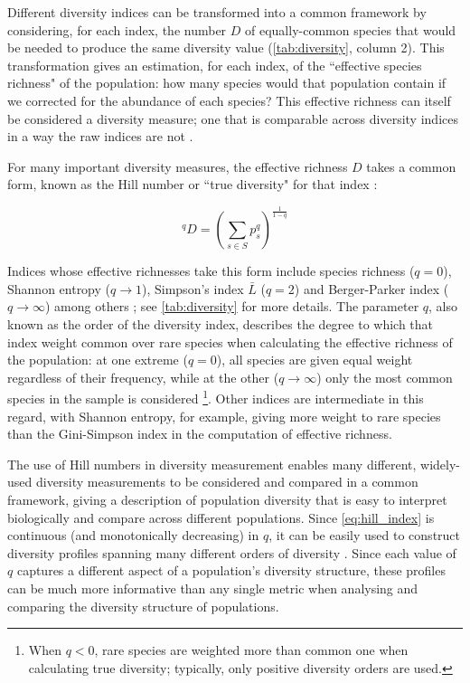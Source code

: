Different diversity indices can be transformed into a common framework by considering, for each index, the number $D$ of equally-common species that would be needed to produce the same diversity value (\autoref{tab:diversity}, column 2). This transformation gives an estimation, for each index, of the ``effective species richness" of the population: how many species would that population contain if we corrected for the abundance of each species? This effective richness can itself be considered a diversity measure; one that is comparable across diversity indices in a way the raw indices are not \citep{jost2006entropy}.

For many important diversity measures, the effective richness $D$ takes a common form, known as the Hill number or ``true diversity" for that index \citep{hill1973diversity, jost2006entropy}:

\begin{equation}
^qD = \left(\sum_{s \in S} p_s^q \right)^{\frac{1}{1-q}}
\label{eq:hill_index}
\end{equation}

Indices whose effective richnesses take this form include species richness ($q=0$), Shannon entropy ($q \to 1$), Simpson's index $\bar{L}$ ($q = 2$) and Berger-Parker index ($q \to \infty$) among others \citep{peet1974diversity, hill1973diversity, jost2006entropy, miho2018strategies}; see \autoref{tab:diversity} for more details. The parameter $q$, also known as the order of the diversity index, describes the degree to which that index weight common over rare species when calculating the effective richness of the population: at one extreme ($q=0$), all species are given equal weight regardless of their frequency, while at the other ($q \to \infty$) only the most common species in the sample is considered \footnote{When $q < 0$, rare species are weighted more than common one when calculating true diversity; typically, only positive diversity orders are used.}. Other indices are intermediate in this regard, with Shannon entropy, for example, giving more weight to rare species than the Gini-Simpson index in the computation of effective richness. %

The use of Hill numbers in diversity measurement enables many different, widely-used diversity measurements to be considered and compared in a common framework, giving a description of population diversity that is easy to interpret biologically and compare across different populations. Since \autoref{eq:hill_index} is continuous (and monotonically decreasing) in $q$, it can be easily used to construct diversity profiles spanning many different orders of diversity \citep{miho2018strategies}. %
Since each value of $q$ captures a different aspect of a population's diversity structure, these profiles can be much more informative than any single metric when analysing and comparing the diversity structure of populations. %


